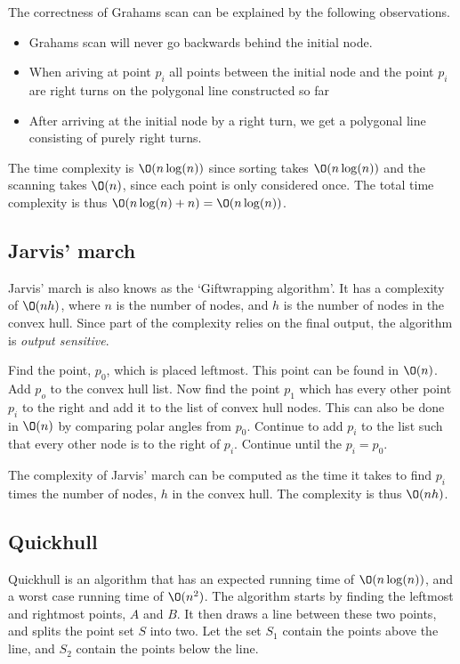 \documentclass[10pt]{article}
\begin{document}
The correctness of Grahams scan can be explained by the following observations. 

\begin{itemize}
  \item Grahams scan will never go backwards behind the initial node. 
  \item When ariving at point $p_i$ all points between the initial node and the point $p_i$ are right turns on the polygonal line constructed so far
  \item After arriving at the initial node by a right turn, we get a polygonal line consisting of purely right turns. 
\end{itemize}



The time complexity is $\O(n\log(n))$ since sorting takes $\O(n\log(n))$ and the scanning takes $\O(n)$, since each point is only considered once. The total time complexity is thus $\O(n\log(n)+n)=\O(n\log(n))$.


\subsection{Jarvis' march} %
\label{sub:jarvis_march}
Jarvis' march is also knows as the `Giftwrapping algorithm'. It has a complexity of $\O(nh)$, where $n$ is the number of nodes, and $h$ is the number of nodes in the convex hull. Since part of the complexity relies on the final output, the algorithm is \emph{output sensitive}.

Find the point, $p_0$, which is placed leftmost. This point can be found in $\O(n)$. Add $p_o$ to the convex hull list. Now find the point $p_1$ which has every other point $p_i$ to the right and add it to the list of convex hull nodes. This can also be done in $\O(n)$ by comparing polar angles from $p_0$. Continue to add $p_i$ to the list such that every other node is to the right of $p_i$. Continue until the $p_i=p_0$.

The complexity of Jarvis' march can be computed as the time it takes to find $p_i$ times the number of nodes, $h$ in the convex hull. The complexity is thus $\O(nh)$.


\subsection{Quickhull} %
\label{sub:quickhull}
Quickhull is an algorithm that has an expected running time of $\O(n\log(n))$, and a worst case running time of $\O(n^2)$. The algorithm starts by finding the leftmost and rightmost points, $A$ and $B$. It then draws a line between these two points, and splits the point set $S$ into two. Let the set $S_1$ contain the points above the line, and $S_2$ contain the points below the line. 
\end{document}
